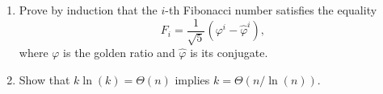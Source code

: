 \documentclass[Chapter03]{subfiles}
\begin{document}
\begin{enumerate}
\begin{answer}
		\end{answer}

		\item Prove by induction that the $i$-th Fibonacci number satisfies the equality
		\[
			F_i = \frac{1}{\sqrt{5}}(\varphi^i - \hat\varphi^i),
		\]
		where $\varphi$ is the golden ratio and $\hat\varphi$ is its conjugate.
		\begin{answer}
			
		\end{answer}

		\item Show that $k\ln(k) = \Theta(n)$ implies $k = \Theta(n / \ln(n))$.
		\begin{answer}
			
		\end{answer}

	\end{enumerate}
\end{document}
